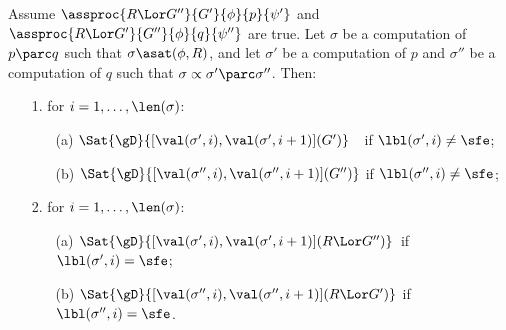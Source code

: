 \documentclass[runningheads]{llncs}
\begin{document}
\begin{lemma}
\label{lemma-soundness-parc-i}
Assume $\assproc{R \Lor G''}{G'}{\phi}{p}{\psi'}$ and
$\assproc{R \Lor G'}{G''}{\phi}{q}{\psi''}$ are true.
Let $\sigma$ be a computation of $p \parc q$ such that
$\sigma \asat(\phi,R)$, and
let $\sigma'$ be a computation of $p$ and $\sigma''$ be a computation of 
$q$ such that $\sigma \propto \sigma' \parc \sigma''$.
Then:
\begin{enumerate}
\item[\textup{1.}]
for $i = 1, \ldots, \len(\sigma)$:
\begin{enumerate}  
\item[\textup{(a)}]
$\Sat{\gD}{[\val(\sigma',i),\val(\sigma',i+1)](G')}$\,\,\,\, 
if $\lbl(\sigma',i) \neq \sfe$;
\item[\textup{(b)}]
$\Sat{\gD}{[\val(\sigma'',i),\val(\sigma'',i+1)](G'')}$ 
if $\lbl(\sigma'',i) \neq \sfe$;
\end{enumerate}  
\item[\textup{2.}]
for $i = 1, \ldots, \len(\sigma)$:
\begin{enumerate}  
\item[\textup{(a)}]
$\Sat{\gD}{[\val(\sigma',i),\val(\sigma',i+1)](R \Lor G'')}$\, 
if $\lbl(\sigma',i) = \sfe$;
\item[\textup{(b)}]
$\Sat{\gD}{[\val(\sigma'',i),\val(\sigma'',i+1)](R \Lor G')}$ 
if $\lbl(\sigma'',i) = \sfe$.
\end{enumerate}  
\end{enumerate}
\end{lemma}
%
\end{document}
